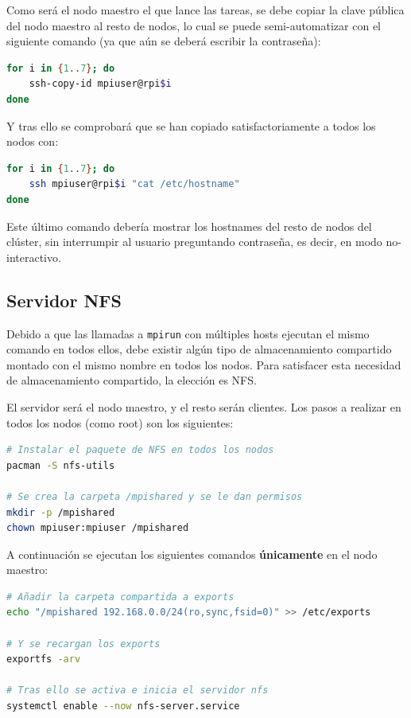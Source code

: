 Como será el nodo maestro el que lance las tareas, se debe copiar la clave pública del nodo maestro al resto de nodos, lo cual se puede semi-automatizar con el siguiente comando (ya que aún se deberá escribir la contraseña):

\begin{lstlisting}[language=bash]
for i in {1..7}; do
    ssh-copy-id mpiuser@rpi$i
done
\end{lstlisting}

Y tras ello se comprobará que se han copiado satisfactoriamente a todos los nodos con:
\begin{lstlisting}[language=bash]
for i in {1..7}; do
    ssh mpiuser@rpi$i "cat /etc/hostname"
done
\end{lstlisting}
Este último comando debería mostrar los hostnames del resto de nodos del clúster, sin interrumpir al usuario preguntando contraseña, es decir, en modo no-interactivo.


\subsection{Servidor NFS}
\label{ssec:serv_nfs}
Debido a que las llamadas a \texttt{mpirun} con múltiples hosts ejecutan el mismo comando en todos ellos, debe existir algún tipo de almacenamiento compartido montado con el mismo nombre en todos los nodos. Para satisfacer esta necesidad de almacenamiento compartido, la elección es NFS.

El servidor será el nodo maestro, y el resto serán clientes. Los pasos a realizar en todos los nodos (como root) son los siguientes:

\begin{lstlisting}[language=bash]
# Instalar el paquete de NFS en todos los nodos
pacman -S nfs-utils

# Se crea la carpeta /mpishared y se le dan permisos
mkdir -p /mpishared
chown mpiuser:mpiuser /mpishared
\end{lstlisting}

A continuación se ejecutan los siguientes comandos \textbf{únicamente} en el nodo maestro:

\begin{lstlisting}[language=bash]
# Añadir la carpeta compartida a exports
echo "/mpishared 192.168.0.0/24(ro,sync,fsid=0)" >> /etc/exports

# Y se recargan los exports
exportfs -arv

# Tras ello se activa e inicia el servidor nfs
systemctl enable --now nfs-server.service
\end{lstlisting}

